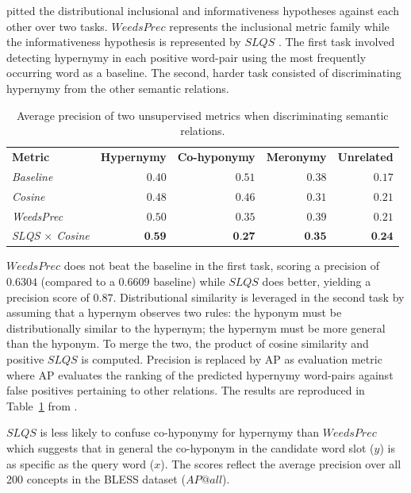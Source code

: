 \citeauthor{santus2014chasing} pitted the distributional inclusional and informativeness hypotheses against each other over two tasks.  $WeedsPrec$ \citep{weeds2003general} represents the inclusional metric family while the informativeness hypothesis is represented by $SLQS$ \citep{santus2014chasing}.  The first task involved detecting hypernymy in each positive word-pair using the most frequently occurring word as a baseline.  The second, harder task consisted of discriminating hypernymy from the other semantic relations.

\begin{table}\centering
    \begin{tabular}{@{}lrrrr@{}} \toprule
    \textbf{Metric}  & \textbf{Hypernymy} & \textbf{Co-hyponymy} & \textbf{Meronymy} & \textbf{Unrelated} \\
    \cmidrule{1-5}
    \textit{Baseline}   & $0.40$ & $0.51$ & $0.38$ & $0.17$ \\
    \textit{Cosine}   & $0.48$ & $0.46$ & $0.31$ & $0.21$ \\
    \textit{WeedsPrec}   & $0.50$ & $0.35$ & $0.39$ & $0.21$ \\
    \textit{SLQS $\times$ Cosine}   & $\textbf{0.59}$ & $\textbf{0.27}$ & $\textbf{0.35}$ & $\textbf{0.24}$ \\
    \bottomrule
    \end{tabular}
    \caption{Average precision of two unsupervised metrics when discriminating semantic relations.}\label{tab:santus_comparison}
\end{table}

$WeedsPrec$ does not beat the baseline in the first task, scoring a precision of $0.6304$ (compared to a $0.6609$ baseline) while $SLQS$ does better, yielding a precision score of $0.87$.  Distributional similarity is leveraged in the second task by assuming that a hypernym observes two rules: the hyponym must be distributionally similar to the hypernym; the hypernym must be more general than the hyponym.  To merge the two, the product of cosine similarity and positive $SLQS$ is computed.  Precision is replaced by \ac{AP} as evaluation metric where \ac{AP} evaluates the ranking of the predicted hypernymy word-pairs against false positives pertaining to other relations.  The results are reproduced in Table~\ref{tab:santus_comparison} from \citet{santus2014chasing}.

$SLQS$ is less likely to confuse co-hyponymy for hypernymy than $WeedsPrec$ which suggests that in general the co-hyponym in the candidate word slot ($y$) is as specific as the query word ($x$).  The scores reflect the average precision over all 200 concepts in the BLESS dataset ($AP@all$).

